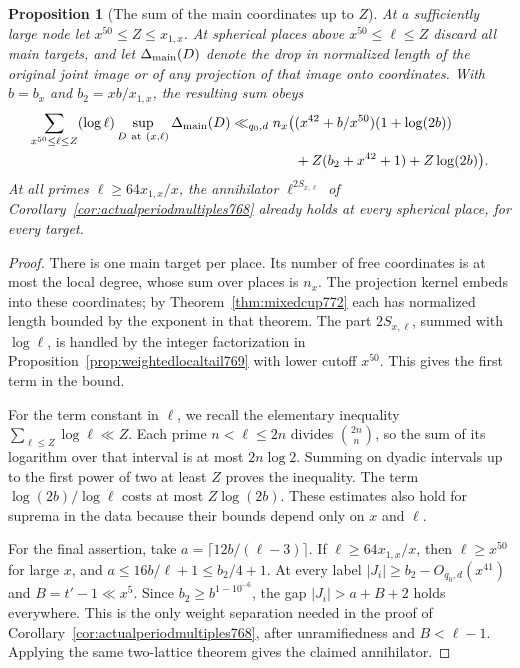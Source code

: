 \documentclass[a4paper,11pt]{article}
\newtheorem{proposition}{Proposition}[section]
\theoremstyle{definition}
\theoremstyle{remark}
\numberwithin{equation}{section}
\begin{document}
\begin{proposition}[The sum of the main coordinates up to \(Z\)]
\leavevmode\label{prop:mixedrange773}
At a sufficiently large node let \(x^{50}\le Z\le x_{1,x}\).
At spherical places above \(x^{50}\le\ell\le Z\) discard
all main targets, and let \(\Delta_{\rm main}(D)\) denote
the drop in normalized length of the original joint image
or of any projection of that image onto coordinates.
With \(b=b_x\) and \(b_2=xb/x_{1,x}\), the resulting sum obeys
\[
 \begin{aligned}
 \sum_{x^{50}\le\ell\le Z}
       (\log\ell)\sup_{D\ {\rm at}\ (x,\ell)}\Delta_{\rm main}(D)
 \ll_{q_0,d} n_x\big(& (x^{42}+b/x^{50})(1+\log(2b))\\
                     &+Z(b_2+x^{42}+1)+Z\log(2b)\big).
 \end{aligned}
\]
At all primes \(\ell\ge64x_{1,x}/x\), the annihilator
\(\ell^{2S_{x,\ell}}\) of
Corollary~\ref{cor:actualperiodmultiples768} already holds
at every spherical place, for every target.
\end{proposition}
\begin{proof}
There is one main target per place. Its number of free
coordinates is at most the local degree, whose sum over
places is \(n_x\). The projection kernel embeds into
these coordinates; by Theorem~\ref{thm:mixedcup772} each
has normalized length bounded by the exponent in that
theorem. The part \(2S_{x,\ell}\), summed with \(\log\ell\),
is handled by the integer factorization in
Proposition~\ref{prop:weightedlocaltail769} with lower
cutoff \(x^{50}\). This gives the first term in the bound.

For the term constant in \(\ell\), we recall the elementary
inequality \(\sum_{\ell\le Z}\log\ell\ll Z\). Each prime
\(n<\ell\le2n\) divides \(\binom{2n}{n}\), so the sum of
its logarithm over that interval is at most \(2n\log2\).
Summing on dyadic intervals up to the first power of two
at least \(Z\) proves the inequality. The term
\(\log(2b)/\log\ell\) costs at most \(Z\log(2b)\).
These estimates also hold for suprema in the data because
their bounds depend only on \(x\) and \(\ell\).

For the final assertion, take
\(a=\lceil12b/(\ell-3)\rceil\). If \(\ell\ge64x_{1,x}/x\),
then \(\ell\ge x^{50}\) for large \(x\), and
\(a\le16b/\ell+1\le b_2/4+1\).
At every label \(|J_i|\ge b_2-O_{q_0,d}(x^{41})\) and
\(B=t'-1\ll x^5\). Since \(b_2\ge b^{1-10^{-6}}\), the
gap \(|J_i|>a+B+2\) holds everywhere. This is the only
weight separation needed in the proof of
Corollary~\ref{cor:actualperiodmultiples768}, after
unramifiedness and \(B<\ell-1\). Applying the same
two-lattice theorem gives the claimed annihilator.
\end{proof}
\end{document}
